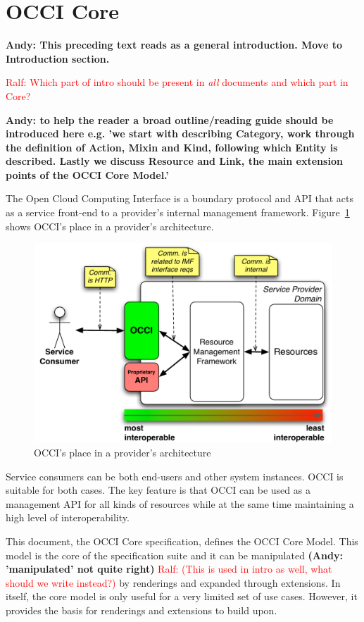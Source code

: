 \documentclass[10pt,a4paper]{article}
\newcommand{\ralf}[1]{\textcolor{red}{Ralf: #1}}
\begin{document}
\section{OCCI Core}
\textbf{Andy: This preceding text reads as a general introduction. Move to Introduction section.}

\ralf{Which part of intro should be present in {\em all} documents and which part in Core?}

\textbf{Andy: to help the reader a broad outline/reading guide should be introduced here
e.g. 'we start with describing Category, work through the definition of Action, Mixin and Kind,
following which Entity is described. Lastly we discuss Resource and Link, the main extension
points of the OCCI Core Model.'}

The Open Cloud Computing Interface is a boundary protocol and API
that acts as a service front-end to a provider's internal management
framework. Figure~\ref{fig:placement} shows OCCI's place in a
provider's architecture.
\begin{figure}[h]
	\centering
	\includegraphics[scale=0.5]{figs/occi-intro.pdf}
	\caption{OCCI's place in a provider's architecture}
	\label{fig:placement}
\end{figure}
Service consumers can be both end-users and other system instances. OCCI is
suitable for both cases. The key feature is that OCCI can be used as a
management API for all kinds of resources while at the same time maintaining a
high level of interoperability.

This document, the OCCI Core specification, defines the OCCI Core Model. This
model is the core of the specification suite and it can be manipulated 
\textbf{(Andy: 'manipulated' not quite right)}
\ralf{(This is used in intro as well, what should we write instead?)}
by renderings and expanded 
through extensions. In itself, the core model is only useful
for a very limited set of use cases. However, it provides the basis for
renderings and extensions to build upon.
\end{document}
